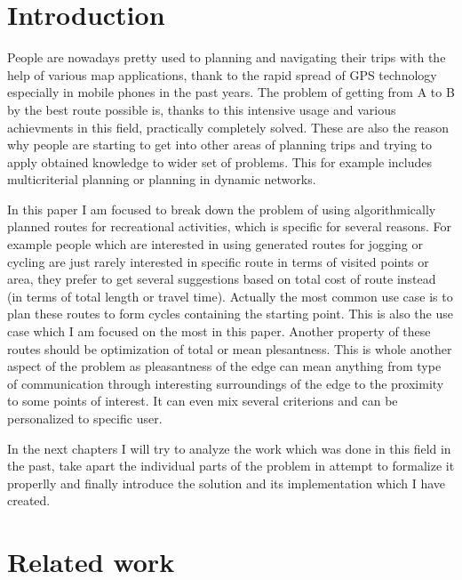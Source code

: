 \documentclass{ctuthesis}
\begin{document}
\maketitle
\chapter{Introduction}
People are nowadays pretty used to planning and navigating their trips with the help of various map applications, thank to the rapid spread of GPS technology especially in mobile phones in the past years. The problem of getting from A to B by the best route possible is, thanks to this intensive usage and various achievments in this field, practically completely solved. These are also the reason why people are starting to get into other areas of planning trips and trying to apply obtained knowledge to wider set of problems. This for example includes multicriterial planning or planning in dynamic networks. \par
In this paper I am focused to break down the problem of using algorithmically planned routes for recreational activities, which is specific for several reasons. For example people which are interested in using generated routes for jogging or cycling are just rarely interested in specific route in terms of visited points or area, they prefer to get several suggestions based on total cost of route instead (in terms of total length or travel time). Actually the most common use case is to plan these routes to form cycles containing the starting point. This is also the use case which I am focused on the most in this paper. Another property of these routes should be optimization of total or mean plesantness. This is whole another aspect of the problem as pleasantness of the edge can mean anything from type of communication through interesting surroundings of the edge to the proximity to some points of interest. It can even mix several criterions and can be personalized to specific user. \par
In the next chapters I will try to  analyze the work which was done in this field in the past, take apart the individual parts of the problem in attempt to formalize it properlly and finally introduce the solution and its implementation which I have created.
\chapter{Related work}
\end{document}
